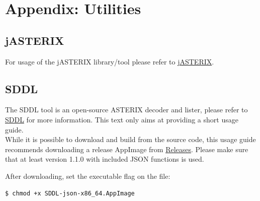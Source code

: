 \section{Appendix: Utilities}
\label{sec:appendix_utils}

\subsection{jASTERIX}
\label{sec:jasterix}

For usage of the jASTERIX library/tool please refer to \href{https://github.com/hpuhr/jASTERIX}{jASTERIX}.

\subsection{SDDL}
\label{sec:sddl}

The SDDL tool is an open-source ASTERIX decoder and lister, please refer to \href{https://github.com/kobelbauer/sddl/}{SDDL} for more information. This text only aims at providing a short usage guide.\\

While it is possible to download and build from the source code, this usage guide recommends downloading a release AppImage from \href{https://github.com/kobelbauer/sddl/releases}{Releases}. Please make sure that at least version 1.1.0 with included JSON functions is used.

After downloading, set the executable flag on the file: 

\begin{lstlisting}
$ chmod +x SDDL-json-x86_64.AppImage
\end{lstlisting}

